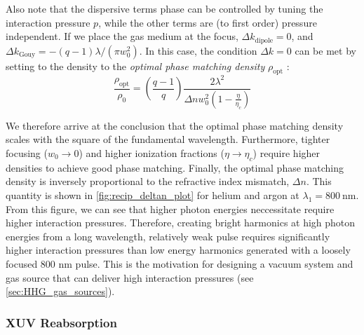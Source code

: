 Also note that the dispersive terms phase can be controlled by tuning the interaction pressure $p$, while the other terms are (to first order) pressure independent. If we place the gas medium at the focus, $\Delta k_{\textrm{dipole}} = 0$, and $\Delta k_{\textrm{Gouy}} = -(q-1) \lambda / (\pi w_0^2)$. In this case, the condition $\Delta k = 0$ can be met by setting to the density to the \textit{optimal phase matching density} $\rho_{\textrm{opt}}$ \cite{rothhardtAbsorptionlimitedPhasematchedHigh2014,pupeikisWaterWindowSoft2020}:
\begin{equation}
\frac{\rho_{\textrm{opt}}}{\rho_0} = \left( \frac{q-1}{q} \right) \frac{2 \lambda^2}{\Delta n w_0^2 \left(1 - \frac{\eta}{\eta_c}\right)}
\label{eqn:phase_matching_density}
\end{equation}

We therefore arrive at the conclusion that the optimal phase matching density scales with the square of the fundamental wavelength. Furthermore, tighter focusing (${w_0 \rightarrow 0}$) and higher ionization fractions (${\eta \rightarrow \eta_c}$) require higher densities to achieve good phase matching. Finally, the optimal phase matching density is inversely proportional to the refractive index mismatch, $\Delta n$. This quantity is shown in \cref{fig:recip_deltan_plot} for helium and argon at $\lambda_1 = 800 \ \textrm{nm}$. From this figure, we can see that higher photon energies neccessitate require higher interaction pressures. Therefore, creating bright harmonics at high photon energies from a long wavelength, relatively weak pulse requires significantly higher interaction pressures than low energy harmonics generated with a loosely focused 800 nm pulse. This is the motivation for designing a vacuum system and gas source that can deliver high interaction pressures (see \cref{sec:HHG_gas_sources}).

\subsubsection{XUV Reabsorption}
\label{sec:XUV_reabsorption}

